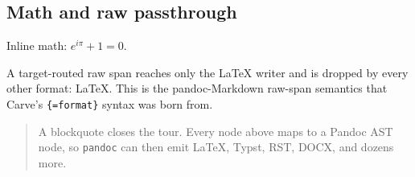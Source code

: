 \subsection{Math and raw passthrough}\label{Math-and-raw-passthrough}

Inline math: \(e^{i\pi} + 1 = 0\).

A target-routed raw span reaches only the LaTeX writer and is dropped by
every other format: \LaTeX. This is the pandoc-Markdown raw-span
semantics that Carve{'}s \texttt{\{=format\}} syntax was born from.

\begin{quote}
A blockquote closes the tour. Every node above maps to a Pandoc AST
node, so \texttt{pandoc} can then emit LaTeX, Typst, RST, DOCX, and
dozens more.
\end{quote}
